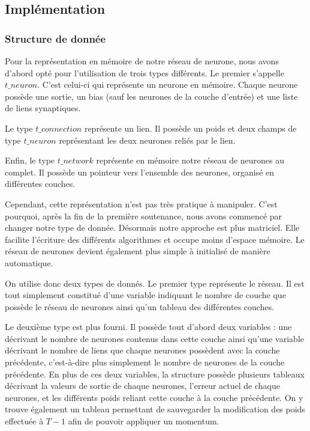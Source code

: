 \documentclass[11pt]{report}
\begin{document}
\subsection{Implémentation}

\subsubsection{Structure de donnée}

Pour la représentation en mémoire de notre réseau de neurone, nous avons d'abord opté pour l'utilisation de trois types différents. Le premier s'appelle $t\_neuron$. C'est celui-ci qui représente un neurone en mémoire. Chaque neurone possède une sortie, un bias (sauf les neurones de la couche d'entrée) et une liste de liens synaptiques.

Le type $t\_connection$ représente un lien. Il possède un poids et deux champs de type $t\_neuron$ représentant les deux neurones reliés par le lien.

Enfin, le type $t\_network$ représente en mémoire notre réseau de neurones au complet. Il possède un pointeur vers l'ensemble des neurones, organisé en différentes couches.

\bigskip


Cependant, cette représentation n'est pas très pratique à manipuler. C'est pourquoi, après la fin de la première soutenance, nous avons commencé par changer notre type de donnée. Désormais notre approche est plus matriciel. Elle facilite l'écriture des différents algorithmes et occupe moins d'espace mémoire. Le réseau de neurones devient également plus simple à initialisé de manière automatique.

\bigskip


On utilise donc deux types de donnés. Le premier type représente le réseau. Il est tout simplement constitué d'une variable indiquant le nombre de couche que possède le réseau de neurones ainsi qu'un tableau des différentes couches.

Le deuxième type est plus fourni. Il possède tout d'abord deux variables : une décrivant le nombre de neurones contenus dans cette couche ainsi qu'une variable décrivant le nombre de liens que chaque neurones possèdent avec la couche précédente, c'est-à-dire plus simplement le nombre de neurones de la couche précédente. En plus de ces deux variables, la structure possède plusieurs tableaux décrivant la valeurs de sortie de chaque neurones, l'erreur actuel de chaque neurones, et les différents poids reliant cette couche à la couche précédente. On y trouve également un tableau permettant de sauvegarder la modification des poids effectuée à $T-1$ afin de pouvoir appliquer un momentum.
\end{document}
